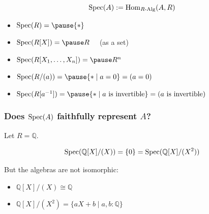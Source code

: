 \documentclass[aspectratio=1610]{beamer}
\begin{document}

\begin{frame}
  \[ \operatorname{Spec}(A) := \mathrm{Hom}_{R\text{-}\mathrm{Alg}}(A, R) \]

  \bigskip
  \begin{example}
    \begin{itemize}
      \item
        $\Spec(R) = \pause \{*\}$
      \pause\item
        $\Spec(R[X]) = \pause R \quad$ (as a set)
      \pause\item
        $\Spec(R[X_1, \dots, X_n]) = \pause R^n$
      \pause\item
        $\Spec(R/(a)) = \pause \{* \mid a = 0\} = (a = 0)$
      \pause\item
        $\Spec(R[a^{-1}]) = \pause \{* \mid \text{$a$ is invertible}\} = (\text{$a$ is invertible})$
    \end{itemize}
  \end{example}
\end{frame}

\begin{frame}
  \frametitle{Does $\operatorname{Spec}(A)$ faithfully represent $A$?}
  Let $R = \mathbb{Q}$.

  \[ \operatorname{Spec}(\mathbb{Q}[X]/(X)) = \{0\} = \operatorname{Spec}(\mathbb{Q}[X]/(X^2))\]

  \bigskip
  But the algebras are not isomorphic:
  \begin{itemize}
    \item
      $\mathbb{Q}[X]/(X) \cong \mathbb{Q}$
    \item
      $\mathbb{Q}[X]/(X^2) = \{ aX + b \mid a, b : \mathbb{Q}\}$
  \end{itemize}
\end{frame}
\end{document}
